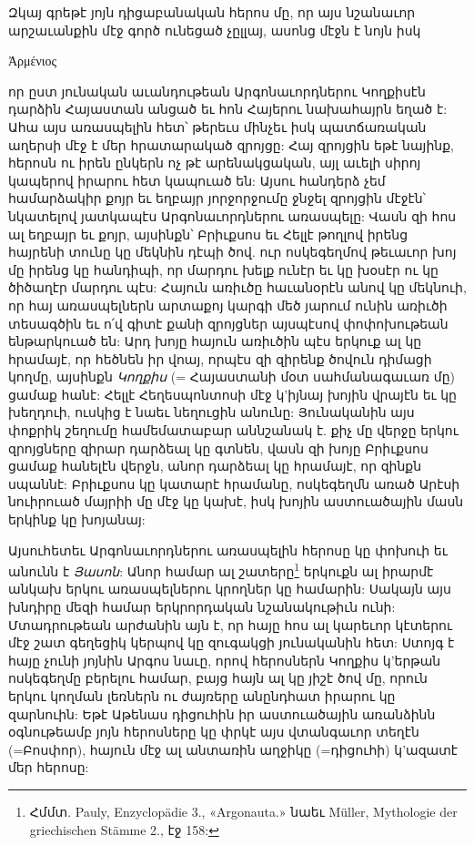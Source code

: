 \documentclass{article}
\begin{document}
{Զկայ գրեթէ յոյն դիցաբանական հերոս մը, որ այս նշանաւոր արշաւանքին մէջ գործ ունեցած չըլլայ, ասոնց մէջն է նոյն իսկ \begin{greek}Ἀρμένιος\end{greek} որ ըստ յունական աւանդութեան Արգոնաւորդներու Կողքիսէն դարձին Հայաստան անցած եւ հոն Հայերու նախահայրն եղած է: Ահա այս առասպելին հետ՝ թերեւս մինչեւ իսկ պատճառական աղերսի մէջ է մեր հրատարակած զրոյցը: Հայ զրոյցին եթէ նայինք, հերոսն ու իրեն ընկերն ոչ թէ արենակցական, այլ աւելի սիրոյ կապերով իրարու հետ կապուած են: Այսու հանդերձ չեմ համարձակիր քոյր եւ եղբայր յորջորջումը ջնջել զրոյցին մէջէն՝ նկատելով յատկապէս Արգոնաւորդներու առասպելը: Վասն զի հոս ալ եղբայր եւ քոյր, այսինքն՝ Բրիւքսոս եւ Հելլէ թողլով իրենց հայրենի տունը կը մեկնին դէպի ծով. ուր ոսկեգեղմով թեւաւոր խոյ մը իրենց կը հանդիպի, որ մարդու խելք ունէր եւ կը խօսէր ու կը ծիծաղէր մարդու պէս: Հայուն առիւծը հաւանօրէն անով կը մեկնուի, որ հայ առասպելներն արտաքոյ կարգի մեծ յարում ունին առիւծի տեսագծին եւ ո՛վ գիտէ քանի զրոյցներ այսպէսով փոփոխութեան ենթարկուած են: Արդ խոյը հայուն առիւծին պէս երկուք ալ կը հրամայէ, որ հեծնեն իր վոայ, որպէս զի զիրենք ծովուն դիմացի կողմը, այսինքն \emph{Կողքիս} (= Հայաստանի մօտ սահմանագաւառ մը) ցամաք հանէ: Հելլէ Հեղեսպոնտոսի մէջ կ'իյնայ խոյին վրայէն եւ կը խեղդուի, ուսկից է նաեւ նեղուցին անունը: Յունականին այս փոքրիկ շեղումը համեմատաբար աննշանակ է. քիչ մը վերջը երկու զրոյցները զիրար դարձեալ կը գտնեն, վասն զի խոյը Բրիւքսոս ցամաք հանելէն վերջն, անոր դարձեալ կը հրամայէ, որ զինքն սպաննէ: Բրիւքսոս կը կատարէ հրամանը, ոսկեգեղմն առած Արէսի նուիրուած մայրիի մը մէջ կը կախէ, իսկ խոյին աստուածային մասն երկինք կը խոյանայ:

Այսուհետեւ Արգոնաւորդներու առասպելին հերոսը կը փոխուի եւ անունն է \emph{Յասոն}: Անոր համար ալ շատերը\footnote{Հմմտ. Pauly, Enzyclopädie 3., «Argonauta.» նաեւ Müller, Mythologie der griechischen Stämme 2., էջ 158:} երկուքն ալ իրարմէ անկախ երկու առասպելներու կրողներ կը համարին: Սակայն այս խնդիրը մեզի համար երկրորդական նշանակութիւն ունի: Մտադրութեան արժանին այն է, որ հայը հոս ալ կարեւոր կէտերու մէջ շատ գեղեցիկ կերպով կը զուգակցի յունականին հետ: Ստոյգ է հայը չունի յոյնին Արգոս նաւը, որով հերոսներն Կողքիս կ'երթան ոսկեգեղմը բերելու համար, բայց հայն ալ կը յիշէ ծով մը, որուն երկու կողման լեռներն ու ժայռերը անընդհատ իրարու կը զարնուին: Եթէ Աթենաս դիցուհին իր աստուածային առանձինն օգնութեամբ յոյն հերոսները կը փրկէ այս վտանգաւոր տեղէն (=Բոսփոր), հայուն մէջ ալ անտառին աղջիկը (=դիցուհի) կ'ազատէ մեր հերոսը:

}
\end{document}
